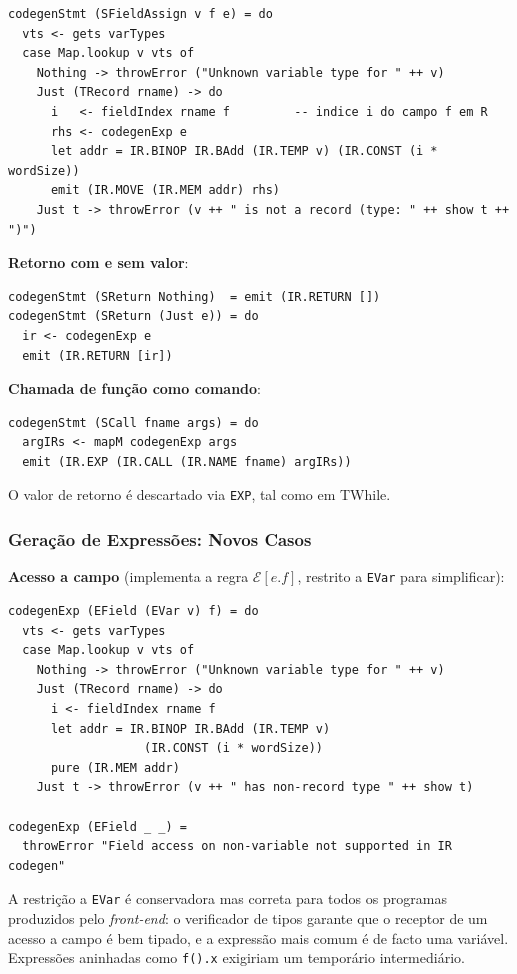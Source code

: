 \begin{verbatim}
codegenStmt (SFieldAssign v f e) = do
  vts <- gets varTypes
  case Map.lookup v vts of
    Nothing -> throwError ("Unknown variable type for " ++ v)
    Just (TRecord rname) -> do
      i   <- fieldIndex rname f         -- indice i do campo f em R
      rhs <- codegenExp e
      let addr = IR.BINOP IR.BAdd (IR.TEMP v) (IR.CONST (i * wordSize))
      emit (IR.MOVE (IR.MEM addr) rhs)
    Just t -> throwError (v ++ " is not a record (type: " ++ show t ++ ")")
\end{verbatim}

\textbf{Retorno com e sem valor}:

\begin{verbatim}
codegenStmt (SReturn Nothing)  = emit (IR.RETURN [])
codegenStmt (SReturn (Just e)) = do
  ir <- codegenExp e
  emit (IR.RETURN [ir])
\end{verbatim}

\textbf{Chamada de função como comando}:

\begin{verbatim}
codegenStmt (SCall fname args) = do
  argIRs <- mapM codegenExp args
  emit (IR.EXP (IR.CALL (IR.NAME fname) argIRs))
\end{verbatim}

O valor de retorno é descartado via \texttt{EXP}, tal como em TWhile.

\subsubsection*{Geração de Expressões: Novos Casos}

\textbf{Acesso a campo} (implementa a regra $\mathcal{E}[e.f]$, restrito
a \texttt{EVar} para simplificar):

\begin{verbatim}
codegenExp (EField (EVar v) f) = do
  vts <- gets varTypes
  case Map.lookup v vts of
    Nothing -> throwError ("Unknown variable type for " ++ v)
    Just (TRecord rname) -> do
      i <- fieldIndex rname f
      let addr = IR.BINOP IR.BAdd (IR.TEMP v)
                   (IR.CONST (i * wordSize))
      pure (IR.MEM addr)
    Just t -> throwError (v ++ " has non-record type " ++ show t)

codegenExp (EField _ _) =
  throwError "Field access on non-variable not supported in IR codegen"
\end{verbatim}

A restrição a \texttt{EVar} é conservadora mas correta para todos os
programas produzidos pelo \emph{front-end}: o verificador de tipos garante
que o receptor de um acesso a campo é bem tipado, e a expressão mais
comum é de facto uma variável. Expressões aninhadas como
\texttt{f().x} exigiriam um temporário intermediário.

